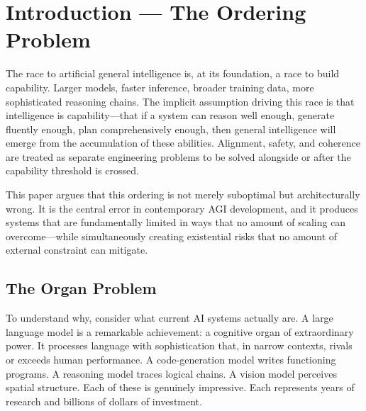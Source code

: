 \documentclass[11pt]{article}
\begin{document}
\noindent{}

\bigskip

\section{Introduction --- The Ordering Problem}

The race to artificial general intelligence is, at its foundation, a race to build capability. Larger models, faster inference, broader training data, more sophisticated reasoning chains. The implicit assumption driving this race is that intelligence is capability---that if a system can reason well enough, generate fluently enough, plan comprehensively enough, then general intelligence will emerge from the accumulation of these abilities. Alignment, safety, and coherence are treated as separate engineering problems to be solved alongside or after the capability threshold is crossed.

This paper argues that this ordering is not merely suboptimal but architecturally wrong. It is the central error in contemporary AGI development, and it produces systems that are fundamentally limited in ways that no amount of scaling can overcome---while simultaneously creating existential risks that no amount of external constraint can mitigate.

\subsection{The Organ Problem}

To understand why, consider what current AI systems actually are. A large language model is a remarkable achievement: a cognitive organ of extraordinary power. It processes language with sophistication that, in narrow contexts, rivals or exceeds human performance. A code-generation model writes functioning programs. A reasoning model traces logical chains. A vision model perceives spatial structure. Each of these is genuinely impressive. Each represents years of research and billions of dollars of investment.
\end{document}
